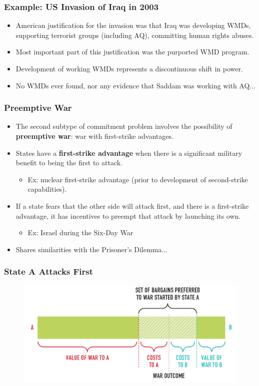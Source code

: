 \documentclass[handout]{beamer}
\begin{document}
\begin{frame} 
	\frametitle{\LARGE{Example: US Invasion of Iraq in 2003}}
	\begin{itemize}
		\item American justification for the invasion was that Iraq was developing WMDs, supporting terrorist groups (including AQ), committing human rights abuses. \pause
		\item Most important part of this justification was the purported WMD program. \pause
		\item Development of working WMDs represents a discontinuous shift in power. \pause
		\item No WMDs ever found, nor any evidence that Saddam was working with AQ...
	\end{itemize}
\end{frame}


\begin{frame} 
	\frametitle{\LARGE{Preemptive War}}
	\begin{itemize}
		\item The second subtype of commitment problem involves the possibility of \textbf{preemptive war}: war with first-strike advantages. \pause
		\item States have a \textbf{first-strike advantage} when there is a significant military benefit to being the first to attack. \pause
		\begin{itemize}
			\item Ex: nuclear first-strike advantage (prior to development of second-strike capabilities).
		\end{itemize}
		\item If a state fears that the other side will attack first, and there is a first-strike advantage, it has incentives to preempt that attack by launching its own. \pause 
		\begin{itemize}
			\item Ex: Israel during the Six-Day War
		\end{itemize}
		\item Shares similarities with the Prisoner's Dilemma...
	\end{itemize}
\end{frame}

\begin{frame} 
	\frametitle{\LARGE{State A Attacks First}}
	\begin{figure}[ht!]
		\centering
		\includegraphics[width=\textwidth,height=0.8\textheight,keepaspectratio]{./stateafirst.png}
	\end{figure}
\end{frame}
\end{document}
